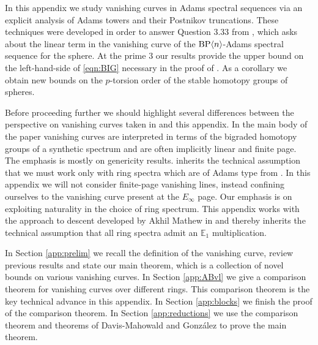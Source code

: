 In this appendix we study vanishing curves in Adams spectral sequences via an explicit analysis of Adams towers and their Postnikov truncations. These techniques were developed in order to answer Question 3.33 from \cite{Akhil}, which asks about the linear term in the vanishing curve of the $\mathrm{BP}\langle n \rangle$-Adams spectral sequence for the sphere. At the prime $3$ our results provide the upper bound on the left-hand-side of \cref{eqn:BIG} necessary in the proof of . As a corollary we obtain new bounds on the $p$-torsion order of the stable homotopy groups of spheres.

Before proceeding further we should highlight several differences between the perspective on vanishing curves taken in  and this appendix. In the main body of the paper vanishing curves are interpreted in terms of the bigraded homotopy groups of a synthetic spectrum and are often implicitly linear and finite page. The emphasis is mostly on genericity results.  inherits the technical assumption that we must work only with ring spectra which are of Adams type from \cite{Pstragowski}. In this appendix we will not consider finite-page vanishing lines, instead confining ourselves to the vanishing curve present at the $E_\infty$ page. Our emphasis is on exploiting naturality in the choice of ring spectrum. This appendix works with the approach to descent developed by Akhil Mathew in \cite{Akhil} and thereby inherits the technical assumption that all ring spectra admit an $\mathbb{E}_1$ multiplication.

In Section \ref{app:prelim} we recall the definition of the vanishing curve, review previous results and state our main theorem, which is a collection of novel bounds on various vanishing curves.
In Section \ref{app:ABvl} we give a comparison theorem for vanishing curves over different rings. This comparison theorem is the key technical advance in this appendix. 
In Section \ref{app:blocks} we finish the proof of the comparison theorem.
In Section \ref{app:reductions} we use the comparison theorem and theorems of Davis-Mahowald and Gonz\'alez \cite{DM3} \cite{GonzalezRegular} to prove the main theorem.

